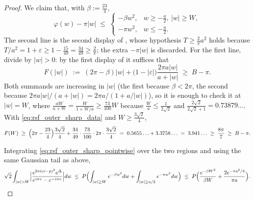 \begin{proof}
We claim that, with $\beta:=\tfrac{23}4$,
\begin{equation}\label{eq:rsf_outer_sharp_pointwise}
  \varphi(w)-\pi\lvert w\rvert\;\le\;
  \begin{cases}
    -\beta w^{2}, & w\ge-\tfrac a2,\ \lvert w\rvert\ge W,\\[2pt]
    -\pi w^{2}, & w\le-\tfrac a2 .
  \end{cases}
\end{equation}
The second line is the second display of , whose hypothesis
$T\ge\tfrac2\pi a^{2}$ holds because $T/a^{2}=1+\varepsilon\ge1-\tfrac{15}{49}=\tfrac{34}{49}
\ge\tfrac2\pi$; the extra $-\pi\lvert w\rvert$ is discarded.  For the first line, divide by
$\lvert w\rvert>0$: by the first display of  it suffices that
\[
  F(\lvert w\rvert)\;:=\;(2\pi-\beta)\lvert w\rvert
    +\bigl(1-\lvert\varepsilon\rvert\bigr)\frac{2\pi a\lvert w\rvert}{a+\lvert w\rvert}
  \;\ge\;B-\pi .
\]
Both summands are increasing in $\lvert w\rvert$ (the first because $\beta<2\pi$, the second
because $2\pi a\lvert w\rvert/(a+\lvert w\rvert)=2\pi a/(1+a/\lvert w\rvert)$), so it is enough
to check it at $\lvert w\rvert=W$, where $\tfrac{aW}{a+W}=\tfrac W{1+W/a}\ge\tfrac{73}{100}W$
because $\tfrac Wa\le\tfrac1{2\sqrt2}$ and $\tfrac{2\sqrt2}{2\sqrt2+1}=0.73879\ldots$.  With
\eqref{eq:rsf_outer_sharp_data} and $W\ge\tfrac{3\sqrt2}4$,
\[
  F(W)\;\ge\;\Bigl(2\pi-\frac{23}4\Bigr)\frac{3\sqrt2}4
      +\frac{34}{49}\cdot\frac{73}{100}\cdot2\pi\cdot\frac{3\sqrt2}4
  \;=\;0.5655\ldots+3.3758\ldots\;=\;3.941\ldots
  \;\ge\;\frac{8\pi}7\;\ge\;B-\pi .
\]

Integrating \eqref{eq:rsf_outer_sharp_pointwise} over the two regions and using the same
Gaussian tail as above,
\[
  \sqrt2\int_{\lvert w\rvert>W}\Bigl\lvert
    \frac{e^{2\pi i(v-p)^{2}}e^{\Delta}}{e^{i\pi v}-e^{-i\pi v}}\Bigr\rvert dw
  \;\le\;P\Bigl(\int_{\lvert w\rvert\ge W}e^{-\beta w^{2}}dw
    +\int_{\lvert w\rvert\ge a/2}e^{-\pi w^{2}}dw\Bigr)
  \;\le\;P\Bigl(\frac{e^{-\beta W^{2}}}{\beta W}+\frac{2e^{-\pi a^{2}/4}}{\pi a}\Bigr).
\]


\end{proof}
